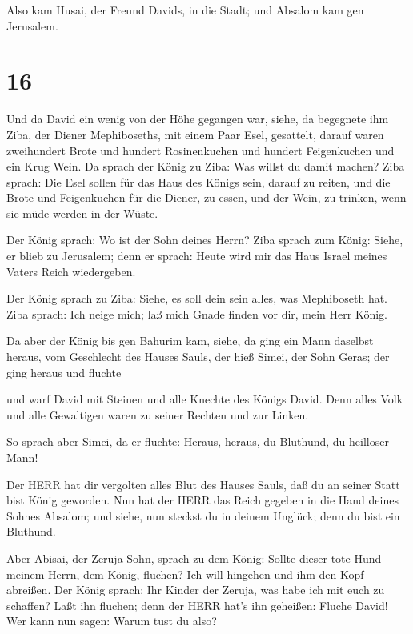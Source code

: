  Also kam Husai, der Freund Davids, in die Stadt; und
Absalom kam gen Jerusalem.

\hypertarget{section-15}{%
\section{16}\label{section-15}}

 Und da David ein wenig von der Höhe gegangen war, siehe, da
begegnete ihm Ziba, der Diener Mephiboseths, mit einem Paar Esel,
gesattelt, darauf waren zweihundert Brote und hundert Rosinenkuchen und
hundert Feigenkuchen und ein Krug Wein.  Da sprach der König
zu Ziba: Was willst du damit machen? Ziba sprach: Die Esel sollen für
das Haus des Königs sein, darauf zu reiten, und die Brote und
Feigenkuchen für die Diener, zu essen, und der Wein, zu trinken, wenn
sie müde werden in der Wüste.

 Der König sprach: Wo ist der Sohn deines Herrn? Ziba sprach
zum König: Siehe, er blieb zu Jerusalem; denn er sprach: Heute wird mir
das Haus Israel meines Vaters Reich wiedergeben.

 Der König sprach zu Ziba: Siehe, es soll dein sein alles,
was Mephiboseth hat. Ziba sprach: Ich neige mich; laß mich Gnade finden
vor dir, mein Herr König.

 Da aber der König bis gen Bahurim kam, siehe, da ging ein
Mann daselbst heraus, vom Geschlecht des Hauses Sauls, der hieß Simei,
der Sohn Geras; der ging heraus und fluchte

 und warf David mit Steinen und alle Knechte des Königs
David. Denn alles Volk und alle Gewaltigen waren zu seiner Rechten und
zur Linken.

 So sprach aber Simei, da er fluchte: Heraus, heraus, du
Bluthund, du heilloser Mann!

 Der HERR hat dir vergolten alles Blut des Hauses Sauls, daß
du an seiner Statt bist König geworden. Nun hat der HERR das Reich
gegeben in die Hand deines Sohnes Absalom; und siehe, nun steckst du in
deinem Unglück; denn du bist ein Bluthund.

 Aber Abisai, der Zeruja Sohn, sprach zu dem König: Sollte
dieser tote Hund meinem Herrn, dem König, fluchen? Ich will hingehen und
ihm den Kopf abreißen.  Der König sprach: Ihr Kinder der
Zeruja, was habe ich mit euch zu schaffen? Laßt ihn fluchen; denn der
HERR hat's ihn geheißen: Fluche David! Wer kann nun sagen: Warum tust du
also?

